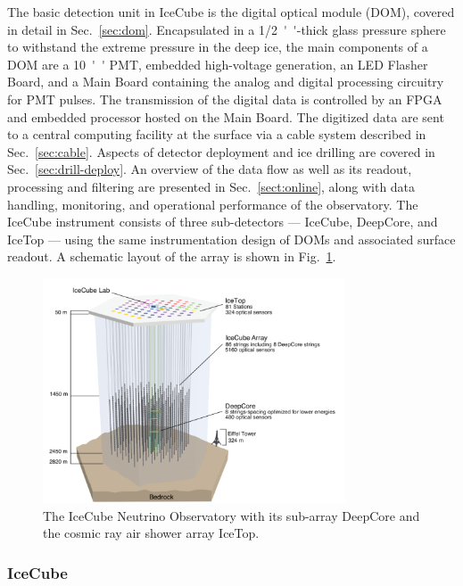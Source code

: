 The basic detection unit in IceCube is the
digital optical module (DOM), covered in detail in Sec.~\ref{sec:dom}.
Encapsulated in a \SI{1/2}{''}-thick glass pressure sphere 
to withstand the extreme pressure in the deep ice, the main components of a DOM
are a \SI{10}{''} PMT, embedded high-voltage generation, an LED Flasher 
Board, and a Main Board containing the analog and digital processing circuitry
for PMT pulses.  The transmission of the digital data is controlled by an FPGA
and embedded processor hosted on the Main Board. The digitized data are sent to a
central computing facility at the surface via a cable system described in
Sec.~\ref{sec:cable}.  Aspects of detector deployment and ice drilling are
covered in Sec.~\ref{sec:drill-deploy}. An overview of the data flow as well as
its readout, processing and filtering are presented in
Sec.~\ref{sect:online}, along with data handling, monitoring, and operational performance of
the observatory. The IceCube instrument consists of three sub-detectors ---
IceCube, DeepCore, and IceTop --- using the same instrumentation design of
DOMs and associated surface readout. A schematic layout of the array is
shown in Fig.~\ref{fig:array}. 

\begin{figure}[!h]
 \centering
 \includegraphics[width=0.8\textwidth]{graphics/intro/ArrayWSeasonsLabels_crop.pdf}
 \caption{The IceCube Neutrino Observatory with its sub-array DeepCore and
   the cosmic ray air shower array IceTop.}
 \label{fig:array}
\end{figure}

\subsubsection{IceCube}

